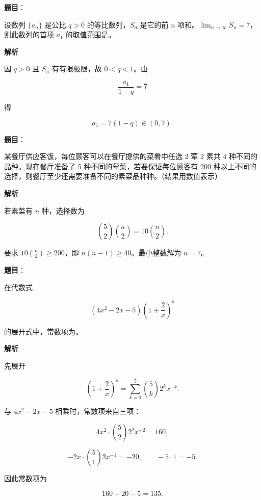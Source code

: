 \begin{answer}

\textbf{题目}：

设数列 $\{a_n\}$ 是公比 $q>0$ 的等比数列，$S_n$ 是它的前 $n$ 项和。$\displaystyle\lim_{n\to\infty}S_n=7$，则此数列的首项 $a_1$ 的取值范围是\gkblank{}。

\textbf{解析}

因 $q>0$ 且 $S_n$ 有有限极限，故 $0<q<1$。由

\nopagebreak[4]
\[
\frac{a_1}{1-q}=7
\]

得

\nopagebreak[4]
\[
a_1=7(1-q)\in(0,7).
\]


\end{answer}
\begin{answer}

\textbf{题目}：

某餐厅供应客饭，每位顾客可以在餐厅提供的菜肴中任选 2 荤 2 素共 4 种不同的品种。现在餐厅准备了 5 种不同的荤菜，若要保证每位顾客有 200 种以上不同的选择，则餐厅至少还需要准备不同的素菜品种\gkblank{}种。（结果用数值表示）

\textbf{解析}

若素菜有 $n$ 种，选择数为

\nopagebreak[4]
\[
\binom52\binom n2=10\binom n2.
\]

要求 $10\binom n2\ge200$，即 $n(n-1)\ge40$。最小整数解为 $n=7$。


\end{answer}
\begin{answer}

\textbf{题目}：

在代数式

\nopagebreak[4]
\[
(4x^2-2x-5)\left(1+\frac2x\right)^5
\]

的展开式中，常数项为\gkblank{}。

\textbf{解析}

先展开

\nopagebreak[4]
\[
\left(1+\frac2x\right)^5
=\sum_{k=0}^{5}\binom5k2^k x^{-k}.
\]

与 $4x^2-2x-5$ 相乘时，常数项来自三项：

\nopagebreak[4]
\[
4x^2\cdot\binom52 2^2x^{-2}=160,
\]

\nopagebreak[4]
\[
-2x\cdot\binom51 2x^{-1}=-20,
\qquad
-5\cdot1=-5.
\]

因此常数项为

\nopagebreak[4]
\[
160-20-5=135.
\]


\end{answer}

